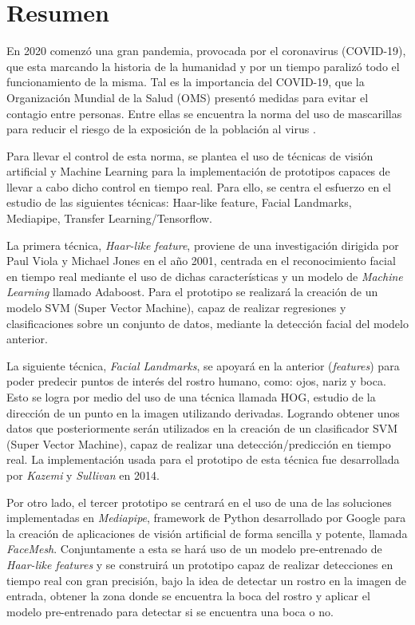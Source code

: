 
\chapter*{Resumen}

En 2020 comenzó una gran pandemia, provocada por el coronavirus (COVID-19), que esta marcando la historia de la humanidad y por un tiempo paralizó todo el funcionamiento de la misma. Tal es la importancia del COVID-19, que la Organización Mundial de la Salud (OMS) presentó medidas para evitar el contagio entre personas. Entre ellas se encuentra la norma del uso de mascarillas para reducir el riesgo de la exposición de la población al virus \cite{oms}. 

Para llevar el control de esta norma, se plantea el uso de técnicas de visión artificial y Machine Learning para la implementación de prototipos capaces de llevar a cabo dicho control en tiempo real. Para ello, se centra el esfuerzo en el estudio de las siguientes técnicas: Haar-like feature, Facial Landmarks, Mediapipe, Transfer Learning/Tensorflow. 

La primera técnica, \textit{Haar-like feature}, proviene de una investigación dirigida por Paul Viola y Michael Jones en el año 2001, centrada en el reconocimiento facial en tiempo real mediante el uso de dichas características y un modelo de \textit{Machine Learning} llamado Adaboost. Para el prototipo se realizará la creación de un modelo SVM (Super Vector Machine), capaz de realizar regresiones y clasificaciones sobre un conjunto de datos, mediante la detección facial del modelo anterior.

La siguiente técnica, \textit{Facial Landmarks}, se apoyará en la anterior (\textit{features}) para poder predecir puntos de interés del rostro humano, como: ojos, nariz y boca. Esto se logra por medio del uso de una técnica llamada HOG, estudio de la dirección de un punto en la imagen utilizando derivadas. Logrando obtener unos datos que posteriormente serán utilizados en la creación de un clasificador SVM (Super Vector Machine), capaz de realizar una detección/predicción en tiempo real. La implementación usada para el prototipo de esta técnica fue desarrollada por \textit{Kazemi} y \textit{Sullivan} en 2014.

Por otro lado, el tercer prototipo se centrará en el uso de una de las soluciones implementadas en \textit{Mediapipe}, framework de Python desarrollado por Google para la creación de aplicaciones de visión artificial de forma sencilla y potente, llamada \textit{FaceMesh}. Conjuntamente a esta se hará uso de un modelo pre-entrenado de \textit{Haar-like features} y se construirá un prototipo capaz de realizar detecciones en tiempo real con gran precisión, bajo la idea de detectar un rostro en la imagen de entrada, obtener la zona donde se encuentra la boca del rostro y aplicar el modelo pre-entrenado para detectar si se encuentra una boca o no.

